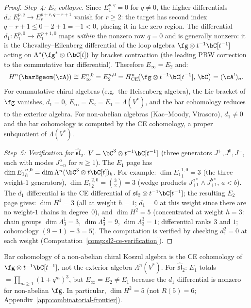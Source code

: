 \begin{proof}
\emph{Step~4: $E_2$ collapse.}
Since $E_1^{p,q} = 0$ for $q \neq 0$, the higher differentials
$d_r\colon E_r^{p,q} \to E_r^{p+r, q-r+1}$ vanish for
$r \geq 2$: the target has second index
$q - r + 1 \leq 0 - 2 + 1 = -1 < 0$, placing it in the
zero region.  The differential
$d_1\colon E_1^{p,0} \to E_1^{p+1,0}$ maps \emph{within}
the nonzero row $q = 0$ and is generally nonzero:
it is the Chevalley--Eilenberg differential of the loop
algebra $\fg \otimes t^{-1}\bC[t^{-1}]$ acting on
$\Lambda^*(\fg^* \otimes t\bC[t])$ by bracket contraction
(the leading PBW correction to the commutative bar
differential).  Therefore $E_\infty = E_2$ and:
\[
H^n(\barBgeom(\cA)) \cong E_\infty^{n,0}
= E_2^{n,0}
= H^n_{\mathrm{CE}}\!\bigl(\fg \otimes t^{-1}\bC[t^{-1}],\, \bC\bigr)
= (\cA^!)_n.
\]
For commutative chiral algebras (e.g.\ the Heisenberg algebra),
the Lie bracket of $\fg$ vanishes, $d_1 = 0$,
$E_\infty = E_2 = E_1 = \Lambda(V^*)$, and the bar cohomology
reduces to the exterior algebra.  For non-abelian algebras
(Kac--Moody, Virasoro), $d_1 \neq 0$ and the bar
cohomology is computed by the CE cohomology, a proper
subquotient of $\Lambda(V^*)$.

\emph{Step~5: Verification for $\widehat{\mathfrak{sl}}_2$.}
$V = \bC^3 \otimes t^{-1}\bC[t^{-1}]$
(three generators $J^+, J^0, J^-$, each with modes
$J^a_{-n}$ for $n \geq 1$).
The $E_1$ page has
$\dim {E_1}^{n,0}_h = \dim \Lambda^n(\bC^3 \otimes t\bC[t])_h$.
For example: $\dim {E_1}^{1,0}_1 = 3$ (the three weight-$1$
generators), $\dim {E_1}^{2,0}_2 = \binom{3}{2} = 3$
(wedge products $J^{a*}_{+1} \wedge J^{b*}_{+1}$, $a < b$).
The $d_1$ differential is the CE differential of
$\mathfrak{sl}_2 \otimes t^{-1}\bC[t^{-1}]$;
the resulting $E_2$ page gives:
$\dim H^1 = 3$ (all at weight $h = 1$; $d_1 = 0$ at this
weight since there are no weight-$1$ chains in degree~$0$),
and $\dim H^2 = 5$ (concentrated at weight $h = 3$:
chain groups $\dim\Lambda^1_3 = 3$,
$\dim\Lambda^2_3 = 9$,
$\dim\Lambda^3_3 = 1$; differential ranks
$3$ and $1$; cohomology
$(9 - 1) - 3 = 5$).
The computation is verified by checking $d_1^2 = 0$
at each weight (Computation~\ref{comp:sl2-ce-verification}).
\end{proof}

\begin{remark}
\label{rem:ce-vs-exterior}
Bar cohomology of a non-abelian chiral Koszul algebra is the CE cohomology of $\fg \otimes t^{-1}\bC[t^{-1}]$, not the exterior algebra $\Lambda^n(V^*)$.  For $\widehat{\mathfrak{sl}}_2$: $E_1$ totals $= \prod_{m \geq 1}(1+q^m)^3$, but $E_\infty = E_2 \neq E_1$ because the $d_1$ differential is nonzero for non-abelian $\fg$.  In particular, $\dim H^2 = 5$ (not $R(5) = 6$; Appendix~\ref{app:combinatorial-frontier}).
\end{remark}

